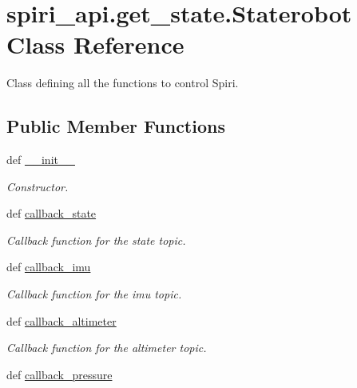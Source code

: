 \hypertarget{classspiri__api_1_1get__state_1_1_staterobot}{\section{spiri\-\_\-api.\-get\-\_\-state.\-Staterobot \-Class \-Reference}
\label{classspiri__api_1_1get__state_1_1_staterobot}
}


\-Class defining all the functions to control \-Spiri.  


\subsection*{\-Public \-Member \-Functions}
\begin{DoxyCompactItemize}
\item 
def \hyperlink{classspiri__api_1_1get__state_1_1_staterobot_a015efa1f3a59211063e167ec0cb1fc3b}{\-\_\-\-\_\-init\-\_\-\-\_\-}
\begin{DoxyCompactList}\small\item\em \-Constructor. \end{DoxyCompactList}\item 
def \hyperlink{classspiri__api_1_1get__state_1_1_staterobot_a81570bdf94a8ea111eb9a51b3044c70d}{callback\-\_\-state}
\begin{DoxyCompactList}\small\item\em \-Callback function for the state topic. \end{DoxyCompactList}\item 
\hypertarget{classspiri__api_1_1get__state_1_1_staterobot_a9136ac9a32b6c7092b3f00ee0fddc3e8}{def \hyperlink{classspiri__api_1_1get__state_1_1_staterobot_a9136ac9a32b6c7092b3f00ee0fddc3e8}{callback\-\_\-imu}}\label{classspiri__api_1_1get__state_1_1_staterobot_a9136ac9a32b6c7092b3f00ee0fddc3e8}

\begin{DoxyCompactList}\small\item\em \-Callback function for the imu topic. \end{DoxyCompactList}\item 
\hypertarget{classspiri__api_1_1get__state_1_1_staterobot_aee8415185786cc6016fc86bc7e0fcd34}{def \hyperlink{classspiri__api_1_1get__state_1_1_staterobot_aee8415185786cc6016fc86bc7e0fcd34}{callback\-\_\-altimeter}}\label{classspiri__api_1_1get__state_1_1_staterobot_aee8415185786cc6016fc86bc7e0fcd34}

\begin{DoxyCompactList}\small\item\em \-Callback function for the altimeter topic. \end{DoxyCompactList}\item 
\hypertarget{classspiri__api_1_1get__state_1_1_staterobot_a7597952c4302e24b63fbbc2653221bc9}{def \hyperlink{classspiri__api_1_1get__state_1_1_staterobot_a7597952c4302e24b63fbbc2653221bc9}{callback\-\_\-pressure}}\label{classspiri__api_1_1get__state_1_1_staterobot_a7597952c4302e24b63fbbc2653221bc9}


\end{DoxyCompactItemize}
